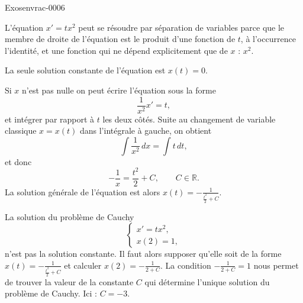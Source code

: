 \begin{corrige}{Exosenvrac-0006}
 
L'équation $x'=tx^2$ peut se résoudre par séparation de variables parce que le membre de droite de l'équation est le produit d'une fonction de $t$, à l'occurrence l'identité, et une fonction qui ne dépend explicitement que de $x$ : $x^2$. 

La seule solution constante de l'équation est $x(t)=0$. 

Si $x$ n'est pas nulle on peut écrire l'équation sous la forme 
\begin{equation}
  \frac{1}{x^2} x' = t,
\end{equation}
 et intégrer par rapport à $t$ les deux côtés. Suite au changement de variable classique $x=x(t)$ dans l'intégrale à gauche, on obtient 
 \begin{equation}
   \int \frac{1}{x^2} \,dx = \int t \, dt,
 \end{equation}
et donc
\begin{equation}
    -\frac{1}{x}= \frac{ t^2 }{2}+C, \qquad C\in\mathbb{R}.
\end{equation}
La solution générale de l'équation est alors $\displaystyle x(t)= -\frac{1}{\frac{ t^2 }{2}+C}$. 

La solution du problème de Cauchy
\begin{equation}
  \begin{cases}
    x'=tx^2,\\
    x(2)=1, 
  \end{cases}
\end{equation} 
n'est pas la solution constante. Il faut alors supposer qu'elle soit de la forme $\displaystyle x(t)= -\frac{1}{\frac{ t^2 }{2}+C}$ et calculer $\displaystyle x(2)= -\frac{1}{2+C}$. La condition $\displaystyle  -\frac{1}{2+C}=1$ nous permet de trouver la valeur de la constante $C$ qui détermine l'unique solution du problème de Cauchy. Ici : $C = -3$.
\end{corrige}
